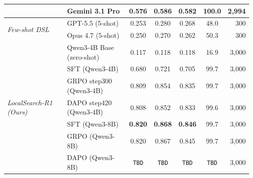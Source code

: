\documentclass[11pt]{article}
\begin{document}
\begin{table}[t]
\begin{tabular}{llccccr}
& Gemini 3.1 Pro & 0.576 & 0.586 & 0.582 & 100.0 & 2{,}994 \\
\midrule
\multirow{2}{*}{\textit{Few-shot DSL}}
& GPT-5.5 (5-shot) & 0.253 & 0.280 & 0.268 & 48.0 & 300 \\
& Opus 4.7 (5-shot) & 0.250 & 0.270 & 0.262 & 50.3 & 300 \\
\midrule
\multirow{7}{*}{\textit{LocalSearch-R1 (Ours)}}
& Qwen3-4B Base (zero-shot) & 0.117 & 0.118 & 0.118 & 16.9 & 3{,}000 \\
& SFT (Qwen3-4B) & 0.680 & 0.721 & 0.705 & 99.7 & 3{,}000 \\
& GRPO step300 (Qwen3-4B) & 0.809 & 0.854 & 0.835 & 99.7 & 3{,}000 \\
& DAPO step420 (Qwen3-4B) & 0.808 & 0.852 & 0.833 & 99.6 & 3{,}000 \\
& SFT (Qwen3-8B) & \textbf{0.820} & \textbf{0.868} & \textbf{0.846} & 99.7 & 3{,}000 \\
& GRPO (Qwen3-8B) & 0.820 & 0.867 & 0.845 & 99.7 & 3{,}000 \\
& DAPO (Qwen3-8B) & \texttt{TBD} & \texttt{TBD} & \texttt{TBD} & \texttt{TBD} & 3{,}000 \\
\bottomrule
\end{tabular}
\end{table}
\end{document}
